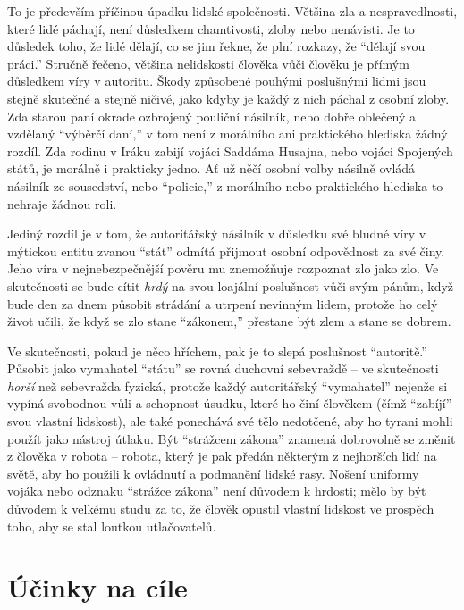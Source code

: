 \documentclass{book}
\begin{document}
To je především příčinou úpadku lidské společnosti. Většina zla a nespravedlnosti, které lidé páchají, není důsledkem chamtivosti, zloby nebo nenávisti. Je to důsledek toho, že lidé dělají, co se jim řekne, že plní rozkazy, že \enquote{dělají svou práci.} Stručně řečeno, většina nelidskosti člověka vůči člověku je přímým důsledkem víry v autoritu. Škody způsobené pouhými poslušnými lidmi jsou stejně skutečné a stejně ničivé, jako kdyby je každý z nich páchal z osobní zloby. Zda starou paní okrade ozbrojený pouliční násilník, nebo dobře oblečený a vzdělaný \enquote{výběrčí daní,} v tom není z morálního ani praktického hlediska žádný rozdíl. Zda rodinu v Iráku zabijí vojáci Saddáma Husajna, nebo vojáci Spojených států, je morálně i prakticky jedno. Ať už něčí osobní volby násilně ovládá násilník ze sousedství, nebo \enquote{policie,} z morálního nebo praktického hlediska to nehraje žádnou roli.

Jediný rozdíl je v tom, že autoritářský násilník v důsledku své bludné víry v mýtickou entitu zvanou \enquote{stát} odmítá přijmout osobní odpovědnost za své činy. Jeho víra v nejnebezpečnější pověru mu znemožňuje rozpoznat zlo jako zlo. Ve skutečnosti se bude cítit \emph{hrdý} na svou loajální poslušnost vůči svým pánům, když bude den za dnem působit strádání a utrpení nevinným lidem, protože ho celý život učili, že když se zlo stane \enquote{zákonem,} přestane být zlem a stane se dobrem.

Ve skutečnosti, pokud je něco hříchem, pak je to slepá poslušnost \enquote{autoritě.} Působit jako vymahatel \enquote{státu} se rovná duchovní sebevraždě -- ve skutečnosti \emph{horší} než sebevražda fyzická, protože každý autoritářský \enquote{vymahatel} nejenže si vypíná svobodnou vůli a schopnost úsudku, které ho činí člověkem (čímž \enquote{zabíjí} svou vlastní lidskost), ale také ponechává své tělo nedotčené, aby ho tyrani mohli použít jako nástroj útlaku. Být \enquote{strážcem zákona} znamená dobrovolně se změnit z člověka v robota -- robota, který je pak předán některým z nejhorších lidí na světě, aby ho použili k ovládnutí a podmanění lidské rasy. Nošení uniformy vojáka nebo odznaku \enquote{strážce zákona} není důvodem k hrdosti; mělo by být důvodem k velkému studu za to, že člověk opustil vlastní lidskost ve prospěch toho, aby se stal loutkou utlačovatelů.

\chapter{Účinky na cíle}
\end{document}
